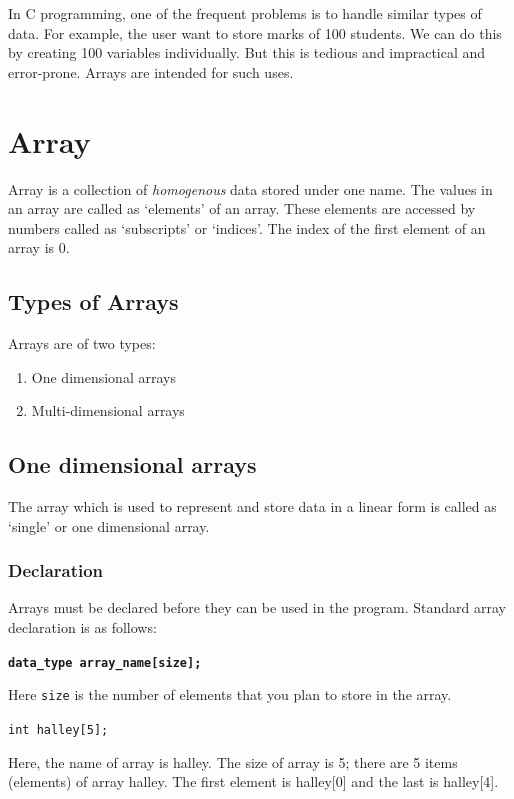 \documentclass[11pt,a4paper]{article}
\author{TalentSprint}
\date{}
\begin{document}
In C programming, one of the frequent problems is to handle similar types of data. For example, the user want to store marks of 100 students. We can do this by creating 100 variables individually.  But this is tedious and impractical and error-prone. Arrays are intended for such uses.

\section*{Array}
Array is a collection of \emph{homogenous} data stored under one name. The values in an array are called as `elements' of an array. These elements are accessed by numbers called as `subscripts' or `indices'. The index of the first element of an array is 0.

\subsection*{Types of Arrays}
Arrays are of two types:
\begin{enumerate}
\item One dimensional arrays
\item Multi-dimensional arrays
\end{enumerate}

\subsection*{One dimensional arrays} 
The array which is used to represent and store data in a linear form is called as `single' or one dimensional array.
\subsubsection*{Declaration} 
Arrays must be declared before they can be used in the program. Standard array declaration is as follows:

\textbf{\texttt{data\_type array\_name[size];}}

Here \texttt{size} is the number of elements that you plan to store in the array.

\lstinline!int halley[5];! 

Here, the name of array is halley. The size of array is 5; there are 5 items (elements) of array halley. The first element is halley[0] and the last is halley[4].
\end{document}
